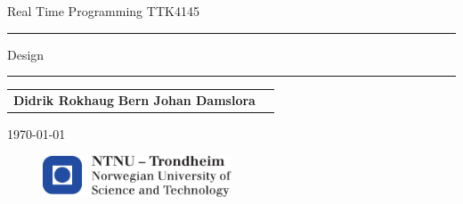 
\begin{titlepage}
    \begin{center}
    	\large
    	Real Time Programming TTK4145
    \end{center}
    \vspace{\fill}
    \rule{\linewidth}{0.5mm}
    \begin{center}
    	\huge
    	Design
    \end{center}
	\rule{\linewidth}{0.5mm}
	\vspace{\fill}

    \large
    \centering
    \begin{table}[H]
    	\centering
    	\large
    	\begin{tabular}{rl}
    		\textbf{Didrik Rokhaug}
            \textbf{Bern Johan Damslora}
    	\end{tabular}
    \end{table}
    \vspace{\fill}
    \begin{center}
    	\large
    	\today
    \end{center}
	\vspace{\fill}
    \begin{figure}[H]
    \centering
    \includegraphics[width=0.5\textwidth]{logontnu_eng}
    \end{figure}
    \thispagestyle{empty}
\end{titlepage}
